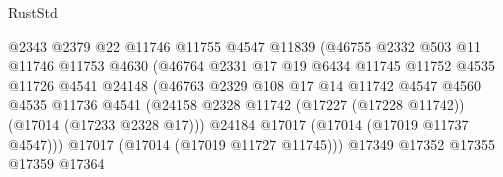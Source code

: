 \begin{lexlean}{RustStd}
\begin{coremodule}
{\begin{coremodule}
{{{{{{{{{{{{{{{{{{{{{{{{{{{{{{{{{{{{{{{{{{{{{{{{{{{{{{{                                        @2343
                                        @2379
                                        @22
                                        @11746
                                        @11755
                                        @4547
                                        @11839
                                        (@46755
                                          @2332
                                          @503
                                          @11
                                          @11746
                                          @11753
                                          @4630
                                          (@46764
                                            @2331
                                            @17
                                            @19
                                            @6434
                                            @11745
                                            @11752
                                            @4535
                                            @11726
                                            @4541
                                            @24148
                                            (@46763
                                              @2329
                                              @108
                                              @17
                                              @14
                                              @11742
                                              @4547
                                              @4560
                                              @4535
                                              @11736
                                              @4541
                                              (@24158
                                                @2328
                                                @11742
                                                (@17227 (@17228 @11742))
                                                (@17014 (@17233 @2328 @17)))
                                              @24184
                                              @17017
                                              (@17014 (@17019 @11737 @4547)))
                                            @17017
                                            (@17014 (@17019 @11727 @11745)))
                                          @17349
                                          @17352
                                          @17355
                                          @17359
                                          @17364
}}}}}}}}}}}}}}}}}}}}}}}}}}}}}}}}}}}}}}}}}}}}}}}}}}}}}}}
\end{coremodule}}
\end{coremodule}
\end{lexlean}
